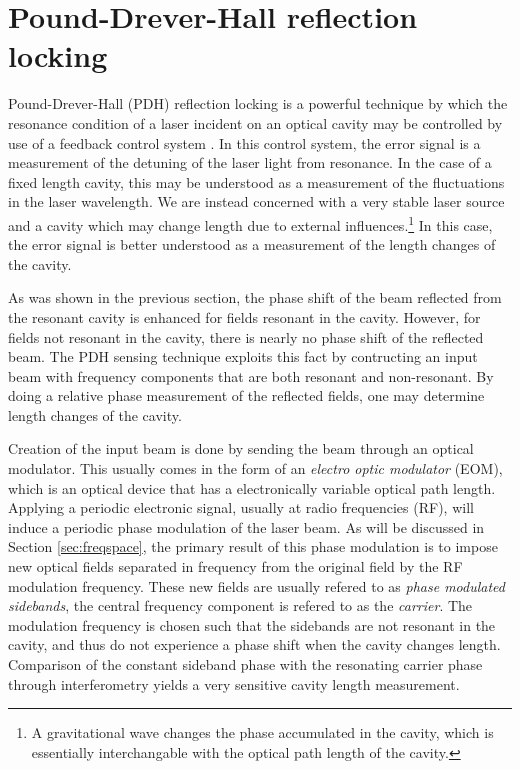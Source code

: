 
\section{Pound-Drever-Hall reflection locking}
Pound-Drever-Hall (PDH) reflection locking is a powerful technique by which the resonance condition of a laser incident on an optical cavity may be controlled by use of a feedback control system \cite{PDH}. %
In this control system, the error signal is a measurement of the detuning of the laser light from resonance. %
In the case of a fixed length cavity, this may be understood as a measurement of the fluctuations in the laser wavelength. %
We are instead concerned with a very stable laser source and a cavity which may change length due to external influences.\footnote{A gravitational wave changes the phase accumulated in the cavity, which is essentially interchangable with the optical path length of the cavity.} In this case, the error signal is better understood as a measurement of the length changes of the cavity.

As was shown in the previous section, the phase shift of the beam reflected from the resonant cavity is enhanced for fields resonant in the cavity. %
However, for fields not resonant in the cavity, there is nearly no phase shift of the reflected beam. %
The PDH sensing technique exploits this fact by contructing an input beam with frequency components that are both resonant and non-resonant. %
By doing a relative phase measurement of the reflected fields, one may determine length changes of the cavity.

Creation of the input beam is done by sending the beam through an optical modulator. %
This usually comes in the form of an \emph{electro optic modulator} (EOM), which is an optical device that has a electronically variable optical path length. %
Applying a periodic electronic signal, usually at radio frequencies (RF), will induce a periodic phase modulation of the laser beam. %
As will be discussed in Section \ref{sec:freqspace}, the primary result of this phase modulation is to impose new optical fields separated in frequency from the original field by the RF modulation frequency. %
These new fields are usually refered to as \emph{phase modulated sidebands}, the central frequency component is refered to as the \emph{carrier}. The modulation frequency is chosen such that the sidebands are not resonant in the cavity, and thus do not experience a phase shift when the cavity changes length. %
Comparison of the constant sideband phase with the resonating carrier phase through interferometry yields a very sensitive cavity length measurement. %


